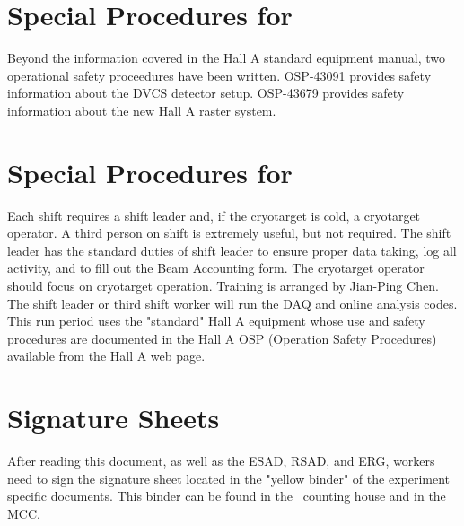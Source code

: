 %
\newpage
\section{Special Procedures for \HALL}

Beyond the information covered in the Hall A standard equipment manual,
two operational safety proceedures have been written.
OSP-43091
provides safety information about the DVCS detector setup.  OSP-43679 provides
safety information about the new Hall A raster system.

%
\newpage
\section{Special Procedures for \EXPTS}

Each shift requires a shift leader and, if the cryotarget is cold, a cryotarget 
operator.  A third person on shift is extremely useful, but not required. The shift leader 
has the standard
duties of shift leader to ensure proper data taking, log all activity, and to fill out
the Beam Accounting form. The cryotarget operator should focus on cryotarget
operation. Training is arranged by Jian-Ping Chen. The shift leader or third
shift worker will run the DAQ and online analysis codes.
This run period uses the "standard" Hall A equipment whose
use and safety procedures are documented in the Hall A OSP (Operation Safety
Procedures) available from the Hall A web page.

\newpage
\section{Signature Sheets}

After reading this document, as well as the ESAD, RSAD, and ERG, workers need to sign
the signature sheet located in the "yellow binder" of the experiment specific documents.
This binder can be found in the \HALL\ counting house and in the MCC.

